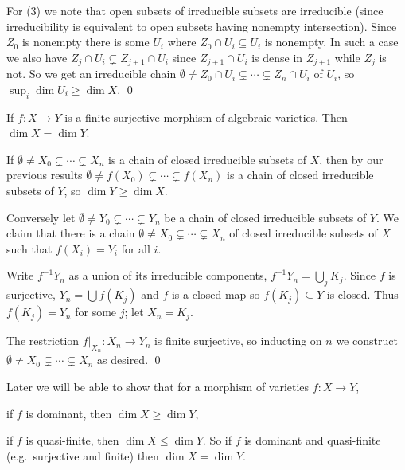     For (3) we note that open subsets of irreducible subsets are irreducible (since irreducibility is equivalent to open subsets having nonempty intersection).
    Since $Z_0$ is nonempty there is some $U_i$ where $Z_0\cap U_i\subseteq U_i$ is nonempty.
    In such a case we also have $Z_j\cap U_i\subsetneq Z_{j+1}\cap U_i$ since $Z_{j+1}\cap U_i$ is dense in $Z_{j+1}$ while $Z_j$ is not.
    So we get an irreducible chain $\emptyset\neq Z_0\cap U_i\subsetneq\cdots\subsetneq Z_n\cap U_i$ of $U_i$, so $\sup_i\dim U_i\geq\dim X$.
    \qed

\eproof

\blemm

    If $f\colon X\to Y$ is a finite surjective morphism of algebraic varieties.
    Then $\dim X=\dim Y$.

\elemm

\bproof

    If $\emptyset\neq X_0\subsetneq\cdots\subsetneq X_n$ is a chain of closed irreducible subsets of $X$, then by our previous results
    $\emptyset\neq f(X_0)\subsetneq\cdots\subsetneq f(X_n)$ is a chain of closed irreducible subsets of $Y$, so $\dim Y\geq\dim X$.

    Conversely let $\emptyset\neq Y_0\subsetneq\cdots\subsetneq Y_n$ be a chain of closed irreducible subsets of $Y$.
    We claim that there is a chain $\emptyset\neq X_0\subsetneq\cdots\subsetneq X_n$ of closed irreducible subsets of $X$ such that $f(X_i)=Y_i$ for all $i$.

    Write $f^{-1}Y_n$ as a union of its irreducible components, $f^{-1}Y_n=\bigcup_jK_j$.
    Since $f$ is surjective, $Y_n=\bigcup f(K_j)$ and $f$ is a closed map so $f(K_j)\subseteq Y$ is closed.
    Thus $f(K_j)=Y_n$ for some $j$; let $X_n=K_j$.

    The restriction $f|_{X_n}\colon X_n\to Y_n$ is finite surjective, so inducting on $n$ we construct $\emptyset\neq X_0\subsetneq\cdots\subsetneq X_n$
    as desired.
    \qed

\eproof

\bnote

    Later we will be able to show that for a morphism of varieties $f\colon X\to Y$,
    \benum
        \item if $f$ is dominant, then $\dim X\geq\dim Y$,
        \item if $f$ is quasi-finite, then $\dim X\leq\dim Y$.
    \eenum
    So if $f$ is dominant and quasi-finite (e.g.\ surjective and finite) then $\dim X=\dim Y$.

